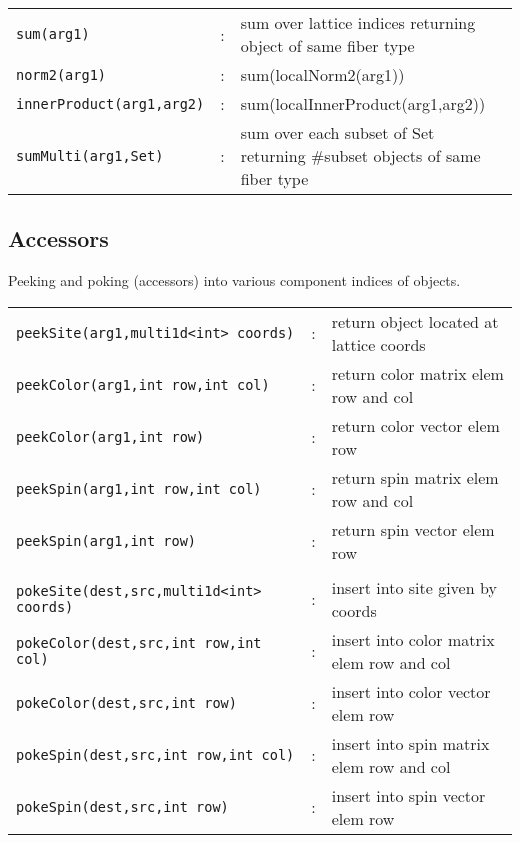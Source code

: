 \documentclass[12pt,letterpaper]{article}
\begin{document}
\begin{flushleft}
\begin{tabular}{lcp{4.0in}}
\verb|sum(arg1)|              &:& sum over lattice indices returning 
                                  object of same fiber type\\
\verb|norm2(arg1)|            &:& sum(localNorm2(arg1))\\
\verb|innerProduct(arg1,arg2)|&:& sum(localInnerProduct(arg1,arg2))\\
\verb|sumMulti(arg1,Set)|     &:& sum over each subset of Set returning \#subset
                                  objects of same fiber type\\
\end{tabular}
\end{flushleft}

\medskip

\subsection{Accessors}
\label{sec:peek}

Peeking and poking (accessors) into various component indices of objects.

\begin{flushleft}
\begin{tabular}{lcp{4.0in}}
\verb|peekSite(arg1,multi1d<int> coords)|&:& return object located at lattice coords\\
\verb|peekColor(arg1,int row,int col)|   &:& return color matrix elem row and col\\
\verb|peekColor(arg1,int row)|           &:& return color vector elem row\\
\verb|peekSpin(arg1,int row,int col)|   &:& return spin matrix elem row and col\\
\verb|peekSpin(arg1,int row)|            &:& return spin vector elem row\\
&&\\
\verb|pokeSite(dest,src,multi1d<int> coords)|&:& insert into site given by coords\\
\verb|pokeColor(dest,src,int row,int col)|   &:& insert into color matrix elem row and col\\
\verb|pokeColor(dest,src,int row)|           &:& insert into color vector elem row\\
\verb|pokeSpin(dest,src,int row,int col)|   &:& insert into spin matrix elem row and col\\
\verb|pokeSpin(dest,src,int row)|            &:& insert into spin vector elem row\\
\end{tabular}
\end{flushleft}
\end{document}
